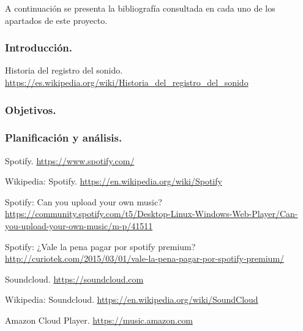 \label{cap:bibliografia}

\begin{bibcomment}
A continuación se presenta la bibliografía consultada en cada uno de los apartados de este proyecto.
\end{bibcomment}

\subsubsection*{Introducción.}

 Historia del registro del sonido. \url{https://es.wikipedia.org/wiki/Historia_del_registro_del_sonido}

\subsubsection*{Objetivos.}

\subsubsection*{Planificación y análisis.}

 Spotify. \url{https://www.spotify.com/}

 Wikipedia: Spotify. \url{https://en.wikipedia.org/wiki/Spotify}

 Spotify: Can you upload your own music? \url{https://community.spotify.com/t5/Desktop-Linux-Windows-Web-Player/Can-you-upload-your-own-music/m-p/41511}

 Spotify: ¿Vale la pena pagar por spotify premium? \url{http://curiotek.com/2015/03/01/vale-la-pena-pagar-por-spotify-premium/}

 Soundcloud. \url{https://soundcloud.com}

 Wikipedia: Soundcloud. \url{https://en.wikipedia.org/wiki/SoundCloud}

 Amazon Cloud Player. \url{https://music.amazon.com}

